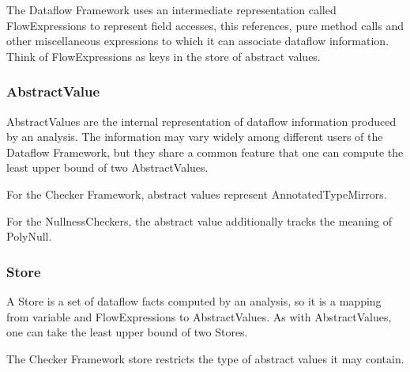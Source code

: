     The Dataflow Framework uses an intermediate representation called FlowExpressions to represent field accesses, this references, pure method calls and other miscellaneous expressions to which it can associate dataflow information.  Think of FlowExpressions as keys in the store of abstract values.


    
\subsubsection{AbstractValue}
\label{sec:abstract_value_classes}

    AbstractValues are the internal representation of dataflow information produced by an analysis.  The information may vary widely among different users of the Dataflow Framework, but they share a common feature that one can compute the least upper bound of two AbstractValues.

        
    For the Checker Framework, abstract values represent AnnotatedTypeMirrors.
        
        
        
    For the NullnessCheckers, the abstract value additionally tracks the meaning of PolyNull.
        
        

\subsubsection{Store}
\label{sec:store_classes}

    A Store is a set of dataflow facts computed by an analysis, so it is a mapping from variable and FlowExpressions to AbstractValues.  As with AbstractValues, one can take the least upper bound of two Stores.


    The Checker Framework store restricts the type of abstract values it may contain.

    
